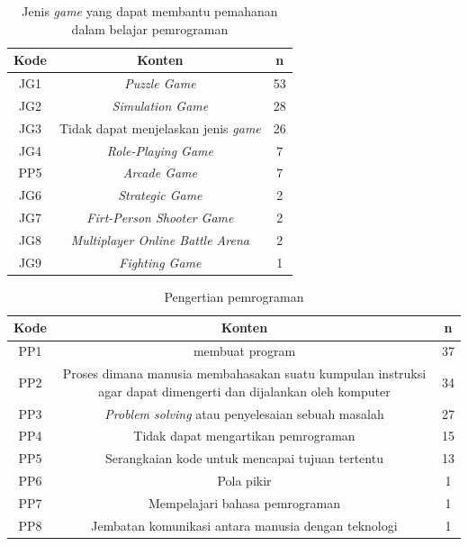 \begin{table}
	\centering
	\caption{Jenis \textit{game} yang dapat membantu pemahanan dalam belajar pemrograman}
	\label{tab:tab1}
	\begin{tabular}{| c | c | c |}
		\hline
		Kode & Konten & n \\
		\hline
		JG1 & \multicolumn{1}{p{10cm}|}{\textit{Puzzle Game}} & 53 \\ \hline
		JG2 & \multicolumn{1}{p{10cm}|}{\textit{Simulation Game}} & 28 \\ \hline
		JG3 & \multicolumn{1}{p{10cm}|}{Tidak dapat menjelaskan jenis \textit{game}} & 26 \\
		\hline
		JG4 & \multicolumn{1}{p{10cm}|}{\textit{Role-Playing Game}} & 7 \\ \hline
		PP5 & \multicolumn{1}{p{10cm}|}{\textit{Arcade Game}} & 7 \\ \hline
		JG6 & \multicolumn{1}{p{10cm}|}{\textit{Strategic Game}} & 2 \\ \hline
		JG7 & \multicolumn{1}{p{10cm}|}{\textit{Firt-Person Shooter Game}} & 2 \\ \hline
		JG8 & \multicolumn{1}{p{10cm}|}{\textit{Multiplayer Online Battle Arena}} & 2 \\ \hline
		JG9 & \multicolumn{1}{p{10cm}|}{\textit{Fighting Game}} & 1 \\ \hline
	\end{tabular}
\end{table}

\begin{table}
	\centering
	\caption{Pengertian pemrograman}
	\label{tab:tab1}
	\begin{tabular}{| c | c | c |}
		\hline
		Kode & Konten & n \\
		\hline
		PP1 & \multicolumn{1}{p{10cm}|}{membuat program} & 37 \\ \hline
		PP2 & \multicolumn{1}{p{10cm}|}{Proses dimana manusia membahasakan suatu kumpulan instruksi agar dapat dimengerti dan dijalankan oleh komputer} & 34 \\ \hline
		PP3 & \multicolumn{1}{p{10cm}|}{\textit{Problem solving} atau penyelesaian sebuah masalah} & 27 \\
		\hline
		PP4 & \multicolumn{1}{p{10cm}|}{Tidak dapat mengartikan pemrograman} & 15 \\ \hline
		PP5 & \multicolumn{1}{p{10cm}|}{Serangkaian kode untuk mencapai tujuan tertentu} & 13 \\ \hline
		PP6 & \multicolumn{1}{p{10cm}|}{Pola pikir} & 1 \\ \hline
		PP7 & \multicolumn{1}{p{10cm}|}{Mempelajari bahasa pemrograman} & 1 \\ \hline
		PP8 & \multicolumn{1}{p{10cm}|}{Jembatan komunikasi antara manusia dengan teknologi} & 1 \\ \hline
	\end{tabular}
\end{table}

